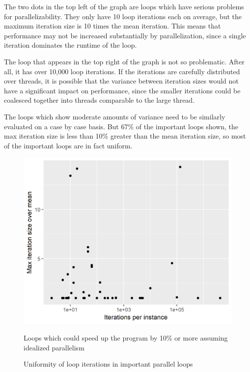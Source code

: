 \documentclass[12pt,twoside]{reedthesis}
\begin{document}
		The two dots in the top left of the graph are loops which have serious problems for parallelizability. They only have 10 loop iterations each on average, but the maximum iteration size is 10 times the mean iteration. This means that performance may not be increased substantially by parallelization, since a single iteration dominates the runtime of the loop. 
		
		The loop that appears in the top right of the graph is not so problematic. After all, it has over 10,000 loop iterations. If the iterations are carefully distributed over threads, it is possible that the variance between iteration sizes would not have a significant impact on performance, since the smaller iterations could be coalesced together into threads comparable to the large thread.
		
		The loops which show moderate amounts of variance need to be similarly evaluated on a case by case basis. But 67\% of the important loops shown, the max iteration size is less than 10\% greater than the mean iteration size, so most of the important loops are in fact uniform. 
		
		
		
		\begin{figure}
			\caption{Uniformity of loop iterations in important parallel loops}
			\label{fig:uniformity-tail-etc}
			
			\begin{minipage}{0.6\textwidth} %
				\includegraphics[scale=0.7]{plots/tail_iters.png}
				{\footnotesize Loops which could speed up the program by 10\% or more assuming idealized parallelism \par}
			\end{minipage}
		\end{figure}
		
\end{document}
